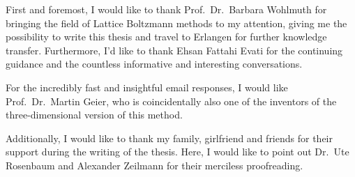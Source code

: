 
First and foremost, I would like to thank Prof.\ Dr.\ Barbara Wohlmuth for bringing the field of Lattice Boltzmann methods to my attention, giving me the possibility to write this thesis and travel to Erlangen for further knowledge transfer.
Furthermore, I'd like to thank Ehsan Fattahi Evati for the continuing guidance and the countless informative and interesting conversations.

For the incredibly fast and insightful email responses, I would like Prof.\ Dr.\ Martin Geier, who is coincidentally also one of the inventors of the three-dimensional version of this method.

Additionally, I would like to thank my family, girlfriend and friends for their support during the writing of the thesis.
Here, I would like to point out Dr.\ Ute Rosenbaum and Alexander Zeilmann for their merciless proofreading.
